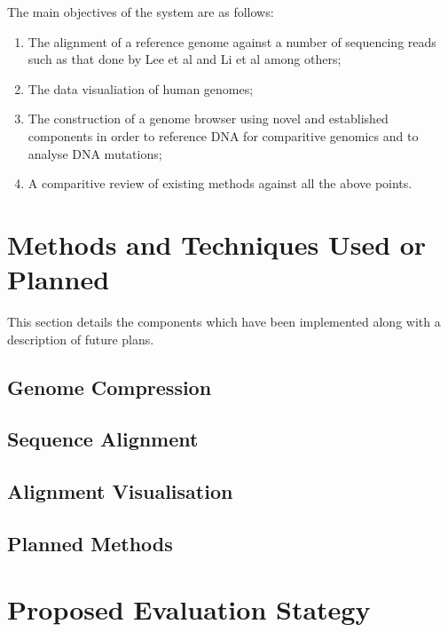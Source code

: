 \documentclass{csfyp}
\begin{document}
The main objectives of the system are as follows:

\begin{enumerate}[nolistsep]

  \item The alignment of a reference genome against a number of sequencing reads such as that done by Lee et al \cite{cgreads} and Li et al \cite{bwtransform} among others;

  \item The data visualiation of human genomes;

  \item The construction of a genome browser using novel and established components in order to reference DNA for comparitive genomics and to analyse DNA mutations;  

  \item A comparitive review of existing methods against all the above points.

\end{enumerate}


\section{Methods and Techniques Used or Planned}

This section details the components which have been implemented along with a description of future plans.

\subsection{Genome Compression}

\subsection{Sequence Alignment}

\subsection{Alignment Visualisation}

\subsection{Planned Methods}


\section{Proposed Evaluation Stategy}
\end{document}
